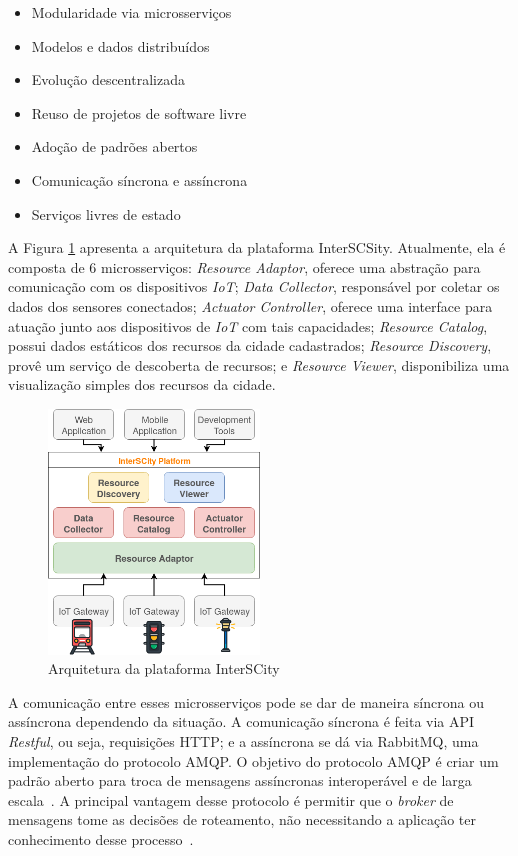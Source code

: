 \begin{itemize}
	\item Modularidade via microsserviços
	\item Modelos e dados distribuídos
	\item Evolução descentralizada
	\item Reuso de projetos de software livre
	\item Adoção de padrões abertos
	\item Comunicação síncrona e assíncrona
	\item Serviços livres de estado
\end{itemize}

A Figura \ref{fig:platform_architecture} apresenta a arquitetura da plataforma InterSCSity.
Atualmente, ela é composta de 6 microsserviços:
\textit{Resource Adaptor}, oferece uma abstração para comunicação com os dispositivos \textit{IoT};
\textit{Data Collector}, responsável por coletar os dados dos sensores conectados;
\textit{Actuator Controller}, oferece uma interface para atuação junto aos dispositivos de \textit{IoT} com tais capacidades;
\textit{Resource Catalog}, possui dados estáticos dos recursos da cidade cadastrados;
\textit{Resource Discovery}, provê um serviço de descoberta de recursos;
e \textit{Resource Viewer}, disponibiliza uma visualização simples dos recursos da cidade. 

\begin{figure}[ht]
	\centering
	\includegraphics[width=0.5\textwidth]{figuras/platform_architecture.png}
	\caption{Arquitetura da plataforma InterSCity}
	\label{fig:platform_architecture}
\end{figure}

A comunicação entre esses microsserviços pode se dar de maneira síncrona ou assíncrona dependendo da situação.
A comunicação síncrona é feita via API \textit{Restful}, ou seja, requisições HTTP; e a assíncrona se dá via RabbitMQ, uma implementação do protocolo AMQP.
O objetivo do protocolo AMQP é criar um padrão aberto para troca de mensagens assíncronas interoperável e de larga escala~\cite{vinoski_2006}.
A principal vantagem desse protocolo é permitir que o \textit{broker} de mensagens tome as decisões de roteamento, não necessitando a aplicação ter conhecimento
desse processo~\cite{vinoski_2006}.

